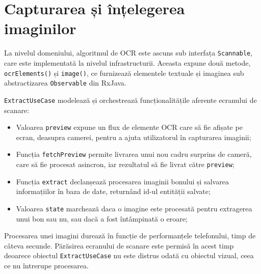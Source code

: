 \section{Capturarea și înțelegerea imaginilor}

La nivelul domeniului, algoritmul de OCR este ascuns sub interfața \texttt{Scannable}, care este implementată la nivelul infrastructurii. Aceasta expune două metode, \texttt{ocrElements()} și \texttt{image()}, ce furnizează elementele textuale și imaginea sub abstractizarea \texttt{Observable} din RxJava.



\texttt{ExtractUseCase} modelează și orchestrează funcționalitățile aferente ecranului de scanare:

\begin{itemize}
  \item 
  Valoarea \texttt{preview} expune un flux de elemente OCR care să fie afișate pe ecran, deasupra camerei, pentru a ajuta utilizatorul în capturarea imaginii;

  \item
  Funcția \texttt{fetchPreview} permite livrarea unui nou cadru surprins de cameră, care să fie procesat asincron, iar rezultatul să fie livrat către \texttt{preview};

  \item
  Funcția \texttt{extract} declanșează procesarea imaginii bonului și salvarea informațiilor în baza de date, returnând id-ul entității salvate;

  \item
  Valoarea \texttt{state} marchează daca o imagine este procesată pentru extragerea unui bon sau nu, sau dacă a fost întâmpinată o eroare;
\end{itemize}

Procesarea unei imagini durează în funcție de performanțele telefonului, timp de câteva secunde. Părăsirea ecranului de scanare este permisă în acest timp deoarece obiectul \texttt{ExtractUseCase} nu este distrus odată cu obiectul vizual, ceea ce nu întrerupe procesarea.
